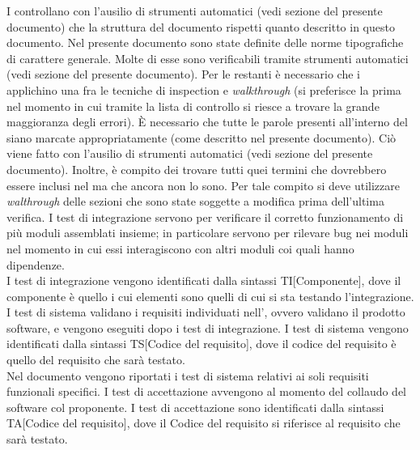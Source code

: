 						I  controllano con l'ausilio di strumenti automatici (vedi sezione  del presente documento) che la struttura del documento rispetti quanto descritto in questo documento.
						Nel presente documento sono state definite delle norme tipografiche di carattere generale. Molte di esse sono verificabili tramite strumenti automatici (vedi sezione  del presente documento). Per le restanti è necessario che i  applichino una fra le tecniche di inspection e \textit{walkthrough}	(si preferisce la prima nel momento in cui tramite la lista di controllo si riesce a trovare la grande maggioranza degli errori).
						È necessario che tutte le parole presenti all'interno del  siano marcate appropriatamente (come descritto nel presente documento). Ciò viene fatto con l'ausilio di strumenti automatici (vedi sezione  del presente documento). Inoltre, è compito dei  trovare tutti quei termini che dovrebbero essere inclusi nel  ma che ancora non lo sono. Per tale compito si deve utilizzare \textit{walthrough} delle sezioni che sono state soggette a modifica prima dell'ultima verifica.
					I test di integrazione servono per verificare il corretto funzionamento di più moduli assemblati insieme; in particolare servono per rilevare bug nei moduli nel momento in cui essi interagiscono con altri moduli coi quali hanno dipendenze.\\
					I test di integrazione vengono identificati dalla sintassi TI[Componente], dove il componente è quello i cui elementi sono quelli di cui si sta testando l'integrazione.
					I test di sistema validano i requisiti individuati nell', ovvero validano il prodotto software, e vengono eseguiti dopo i test di integrazione.
					I test di sistema vengono identificati dalla sintassi TS[Codice del requisito], dove il codice del requisito è quello del requisito che sarà testato.\\
					Nel documento  vengono riportati i test di sistema relativi ai soli requisiti funzionali specifici.
					I test di accettazione avvengono al momento del collaudo del software col proponente.
					I test di accettazione sono identificati dalla sintassi TA[Codice del requisito], dove il Codice del requisito si riferisce al requisito che sarà testato.

